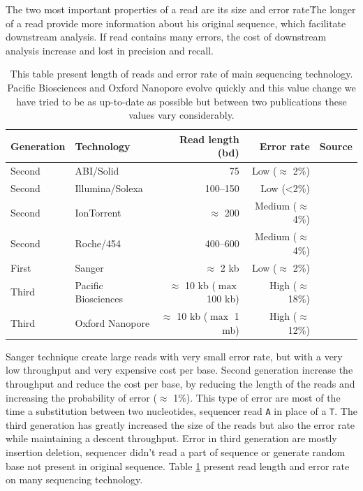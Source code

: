\documentclass[./main.tex]{subfiles}
\begin{document}
The two most important properties of a read are its size and error rate\. The longer of a read provide more information about his original sequence, which facilitate downstream analysis. If read contains many errors, the cost of downstream analysis increase and lost in precision and recall.

\begin{table}[ht]
    \centering
    \begin{tabular}{ll|rr|l}
Generation & Technology          & Read length (bd)                 & Error rate             & Source                          \\ \hline
Second     & ABI/Solid           & 75                               & Low ($\approx$ 2\%)    & \cite{seq_assembly_demystified} \\
Second     & Illumina/Solexa     & 100–150                          & Low (<2\%)             & \cite{seq_assembly_demystified} \\
Second     & IonTorrent          & $\approx$ 200                    & Medium ($\approx$ 4\%) & \cite{seq_assembly_demystified} \\
Second     & Roche/454           & 400–600                          & Medium ($\approx$ 4\%) & \cite{seq_assembly_demystified} \\
First      & Sanger              & $\approx$ 2 kb                   & Low ($\approx$ 2\%)    & \cite{seq_assembly_demystified} \\
Third      & Pacific Biosciences & $\approx$ 10 kb ($\max$ 100 kb)  & High ($\approx$ 18\%)  & \cite{seq_assembly_demystified} \cite{longread_dark_matter} \\
Third      & Oxford Nanopore     & $\approx$ 10 kb ($\max$ 1 mb)    & High ($\approx$ 12\%)  & \cite{longread_dark_matter} \cite{nanopore_read_accuracy} \\
    \end{tabular}
    \caption{This table present length of reads and error rate of main sequencing technology. Pacific Biosciences and Oxford Nanopore evolve quickly and this value change we have tried to be as up-to-date as possible but between two publications these values vary considerably.}
    \label{intro:tab:technology_property}
\end{table}

Sanger technique create large reads with very small error rate, but with a very low throughput and very expensive cost per base.
Second generation increase the throughput and reduce the cost per base, by reducing the length of the reads and increasing the probability of error ($\approx$ 1\%). This type of error are most of the time a substitution between two nucleotides, sequencer read \texttt{A} in place of a \texttt{T}.
The third generation has greatly increased the size of the reads but also the error rate while maintaining a descent throughput. Error in third generation are mostly insertion deletion, sequencer didn't read a part of sequence or generate random base not present in original sequence. Table \ref{intro:tab:technology_property} present read length and error rate on many sequencing technology.
\end{document}

